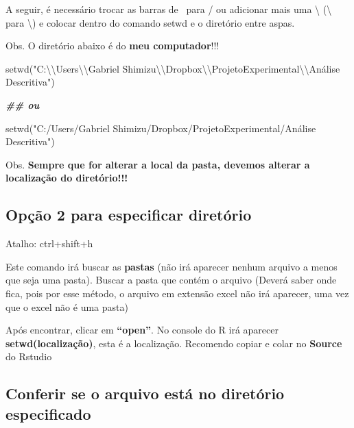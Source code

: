 \documentclass[
]{book}
\newenvironment{Shaded}{\begin{snugshade}}{\end{snugshade}}
\newcommand{\DocumentationTok}[1]{\textcolor[rgb]{0.56,0.35,0.01}{\textbf{\textit{#1}}}}
\newcommand{\FunctionTok}[1]{\textcolor[rgb]{0.00,0.00,0.00}{#1}}
\newcommand{\NormalTok}[1]{#1}
\newcommand{\SpecialCharTok}[1]{\textcolor[rgb]{0.00,0.00,0.00}{#1}}
\newcommand{\StringTok}[1]{\textcolor[rgb]{0.31,0.60,0.02}{#1}}
\begin{document}
A seguir, é necessário trocar as barras de ~para / ou adicionar mais uma \textbackslash{} (\textbackslash{} para \textbackslash) e colocar dentro do comando setwd e o diretório entre aspas.

Obs. O diretório abaixo é do \textbf{meu computador}!!!

\begin{Shaded}
\begin{Highlighting}[]
\FunctionTok{setwd}\NormalTok{(}\StringTok{"C:}\SpecialCharTok{\textbackslash{}\textbackslash{}}\StringTok{Users}\SpecialCharTok{\textbackslash{}\textbackslash{}}\StringTok{Gabriel Shimizu}\SpecialCharTok{\textbackslash{}\textbackslash{}}\StringTok{Dropbox}\SpecialCharTok{\textbackslash{}\textbackslash{}}\StringTok{ProjetoExperimental}\SpecialCharTok{\textbackslash{}\textbackslash{}}\StringTok{Análise Descritiva"}\NormalTok{)}

\DocumentationTok{\#\# ou}

\FunctionTok{setwd}\NormalTok{(}\StringTok{"C:/Users/Gabriel Shimizu/Dropbox/ProjetoExperimental/Análise Descritiva"}\NormalTok{)}
\end{Highlighting}
\end{Shaded}

Obs. \textbf{Sempre que for alterar a local da pasta, devemos alterar a localização do diretório!!!}

\hypertarget{opuxe7uxe3o-2-para-especificar-diretuxf3rio}{%
\subsection{Opção 2 para especificar diretório}\label{opuxe7uxe3o-2-para-especificar-diretuxf3rio}}

Atalho: ctrl+shift+h

Este comando irá buscar as \textbf{pastas} (não irá aparecer nenhum arquivo a menos que seja uma pasta). Buscar a pasta que contém o arquivo (Deverá saber onde fica, pois por esse método, o arquivo em extensão excel não irá aparecer, uma vez que o excel não é uma pasta)

Após encontrar, clicar em \textbf{``open''}. No console do R irá aparecer \textbf{setwd(localização)}, esta é a localização. Recomendo copiar e colar no \textbf{Source} do Rstudio

\hypertarget{conferir-se-o-arquivo-estuxe1-no-diretuxf3rio-especificado}{%
\subsection{Conferir se o arquivo está no diretório especificado}\label{conferir-se-o-arquivo-estuxe1-no-diretuxf3rio-especificado}}
\end{document}
